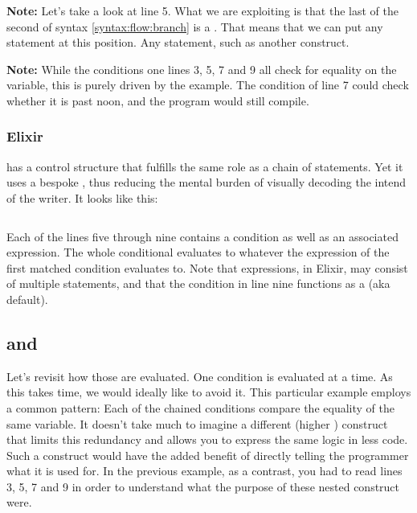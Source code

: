 \textbf{Note:} Let's take a look at line 5. What we are exploiting is that the last  of the second  of syntax \ref{syntax:flow:branch} is a . That means that we can put any statement at this position. Any statement, such as another  construct.

\textbf{Note:} While the conditions one lines 3, 5, 7 and 9 all check for equality on the  variable, this is purely driven by the example. The condition of line 7 could check whether it is past noon, and the program would still compile.

\subsubsection{Elixir}

 has a  control structure that fulfills the same role as a chain of  statements. Yet it uses a bespoke , thus reducing the mental burden of visually decoding the intend of the writer. It looks like this:

\inputminted[linenos,firstline=3,firstnumber=1]{elixir}{../src/elixir/flow_branch/chain/chain.exs}

Each of the lines five through nine contains a condition as well as an associated expression. The whole conditional evaluates to whatever the expression of the first matched condition evaluates to. Note that expressions, in Elixir, may consist of multiple statements, and that the  condition in line nine functions as a  (aka default).

\subsection{ and }

Let's revisit how those  are evaluated. One condition is evaluated at a time. As this takes time, we would ideally like to avoid it. This particular example employs a common pattern: Each of the chained conditions compare the equality of the same variable. It doesn't take much to imagine a different (higher ) construct that limits this redundancy and allows you to express the same logic in less code. Such a construct would have the added benefit of directly telling the programmer what it is used for. In the previous example, as a contrast, you had to read lines 3, 5, 7 and 9 in order to understand what the purpose of these nested construct were.


